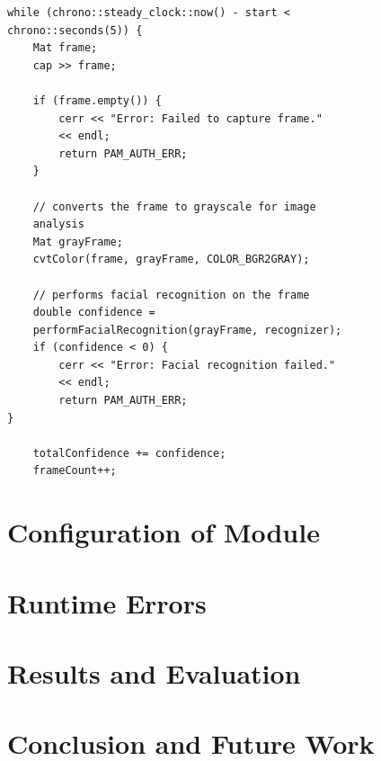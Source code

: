 \documentclass[
]{article}
\begin{document}
\begin{multicols}{2}
\begin{verbatim}
while (chrono::steady_clock::now() - start < 
chrono::seconds(5)) {
    Mat frame;
    cap >> frame;

    if (frame.empty()) {
        cerr << "Error: Failed to capture frame." 
        << endl;
        return PAM_AUTH_ERR;
    }

    // converts the frame to grayscale for image 
    analysis
    Mat grayFrame;
    cvtColor(frame, grayFrame, COLOR_BGR2GRAY);

    // performs facial recognition on the frame
    double confidence = 
    performFacialRecognition(grayFrame, recognizer);
    if (confidence < 0) {
        cerr << "Error: Facial recognition failed." 
        << endl;
        return PAM_AUTH_ERR;
}

    totalConfidence += confidence;
    frameCount++;
\end{verbatim}

\end{multicols}

\begin{multicols}{2}

\section{Configuration of Module}


\section{Runtime Errors}


\section{Results and Evaluation}


\section{Conclusion and Future Work}


\end{multicols}



\end{document}
